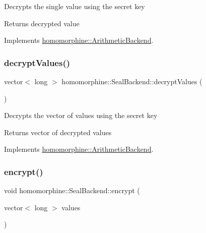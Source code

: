 Decrypts the single value using the secret key

\begin{DoxyReturn}{Returns}
decrypted value 
\end{DoxyReturn}


Implements \hyperlink{classhomomorphine_1_1_arithmetic_backend_af4aad032c46ce51e608092ac206882bd}{homomorphine\+::\+Arithmetic\+Backend}.

\mbox{\label{classhomomorphine_1_1_seal_backend_afa5f6cbb10d74c1911fcb88f722a0159}} 
\subsubsection{\texorpdfstring{decrypt\+Values()}{decryptValues()}}
{\footnotesize\ttfamily vector$<$ long $>$ homomorphine\+::\+Seal\+Backend\+::decrypt\+Values (\begin{DoxyParamCaption}{ }\end{DoxyParamCaption})\hspace{0.3cm}{\ttfamily [virtual]}}

Decrypts the vector of values using the secret key

\begin{DoxyReturn}{Returns}
vector of decrypted values 
\end{DoxyReturn}


Implements \hyperlink{classhomomorphine_1_1_arithmetic_backend_a2fb1ce64e74c4930b7d364ce3b9cc8fe}{homomorphine\+::\+Arithmetic\+Backend}.

\mbox{\label{classhomomorphine_1_1_seal_backend_a89ea7aba58ef337476035848c903f08c}} 
\subsubsection{\texorpdfstring{encrypt()}{encrypt()}\hspace{0.1cm}{\footnotesize\ttfamily [1/2]}}
{\footnotesize\ttfamily void homomorphine\+::\+Seal\+Backend\+::encrypt (\begin{DoxyParamCaption}\item[{vector$<$ long $>$}]{values }\end{DoxyParamCaption})\hspace{0.3cm}{\ttfamily [virtual]}}

